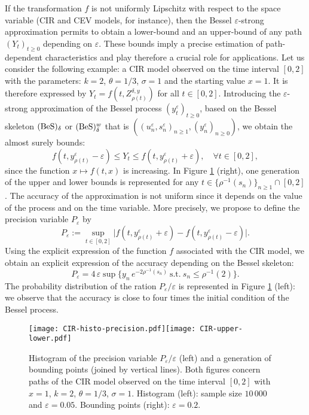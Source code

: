 \documentclass[12pt]{article}
\numberwithin{equation}{section}
\begin{document}
If the transformation $f$ is not uniformly Lipschitz with respect to the space variable (CIR and CEV models, for instance), then the Bessel $\varepsilon$-strong approximation permits to obtain a lower-bound and an upper-bound of any path $(Y_t)_{t\ge 0}$ depending on $\varepsilon$. These bounds imply a precise estimation of path-dependent characteristics and play therefore a crucial role for applications. Let us consider the following example: a CIR model observed on the time interval $[0,2]$ with the parameters: $k=2$, $\theta=1/3$, $\sigma =1$ and the starting value $x=1$. It is therefore expressed by $Y_t=f(t,Z_{\rho(t)}^{\delta,y})$ for all $t\in[0,2]$. Introducing the $\varepsilon$-strong approximation of the Bessel process $(y^\varepsilon_t)_{t\ge 0}$, based on the Bessel skeleton  $({\rm BeS})_\delta$ or $({\rm BeS})_\delta^w$ that is $((u_n^\varepsilon,s_n^\varepsilon)_{n\ge 1},(y_n^\varepsilon)_{n\ge 0})$, we obtain the almost surely bounds:
\[
f(t,y_{\rho(t)}^\varepsilon-\varepsilon)\le Y_t \le f(t, y_{\rho(t)}^\varepsilon+\varepsilon),\quad \forall t\in[0,2],
\]
since the function $x\mapsto f(t,x)$ is increasing. In Figure \ref{fig:my_label:CIR} (right), one generation of the upper and lower bounds is represented for any $t\in \{\rho^{-1}(s_n)\}_{n\ge 1}\cap[0,2]$.  The accuracy of the approximation is not uniform since it depends on the value of the process and on the time variable. More precisely, we propose to define the precision variable $P_\varepsilon$ by
\begin{equation}
\label{eq:def:precis}
P_\varepsilon:=\sup_{t\in[0,2]}\Big|f(t, y_{\rho(t)}^\varepsilon+\varepsilon)-f(t,y_{\rho(t)}^\varepsilon-\varepsilon)\Big|.
\end{equation}
Using the explicit expression of the function $f$ associated with the CIR model, we obtain an explicit expression of the accuracy depending on the Bessel skeleton:
\[
P_\varepsilon=4\,\varepsilon\sup \Big\{y_{n}\, e^{-2\rho^{-1}(s_n)}\ \mbox{s.t.}\ s_n\le \rho^{-1}(2)\Big\}.
\]
The probability distribution of the ration $P_\varepsilon/\varepsilon$ is represented in Figure \ref{fig:my_label:CIR} (left): we observe that the accuracy is close to four times the initial condition of the Bessel process. 

\begin{figure}[h]
\centering
\texttt{[image: CIR-histo-precision.pdf]}\hspace*{-2.4cm}\texttt{[image: CIR-upper-lower.pdf]}
\caption{\small Histogram of the precision variable $P_\varepsilon/\varepsilon$ (left) and a generation of bounding points (joined by vertical lines). Both figures concern paths of the CIR model observed on the time interval $[0,2]$ with $x=1$, $k=2$, $\theta=1/3$, $\sigma=1$.
Histogram (left): sample size $10\,000$ and $\varepsilon=0.05$. Bounding points (right): $\varepsilon=0.2$.
}
\label{fig:my_label:CIR}
\end{figure}
\end{document}
